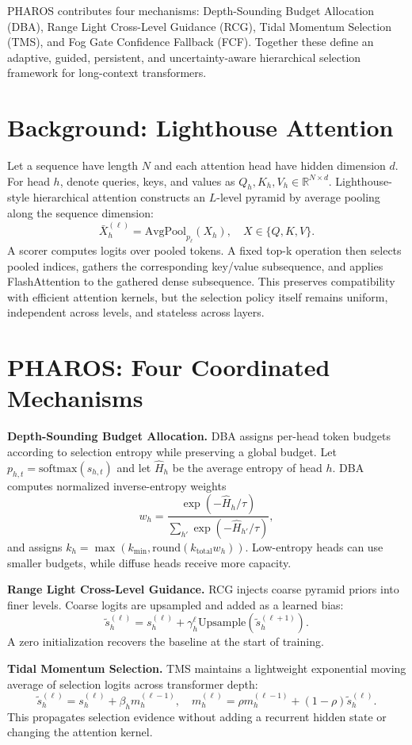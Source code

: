 \documentclass[letterpaper]{article}
\begin{document}
PHAROS contributes four mechanisms: Depth-Sounding Budget Allocation (DBA), Range Light Cross-Level Guidance (RCG), Tidal Momentum Selection (TMS), and Fog Gate Confidence Fallback (FCF). Together these define an adaptive, guided, persistent, and uncertainty-aware hierarchical selection framework for long-context transformers.

\section{Background: Lighthouse Attention}
Let a sequence have length $N$ and each attention head have hidden dimension $d$. For head $h$, denote queries, keys, and values as $Q_h,K_h,V_h \in \mathbb{R}^{N\times d}$. Lighthouse-style hierarchical attention constructs an $L$-level pyramid by average pooling along the sequence dimension:
\[
\bar{X}^{(\ell)}_h = \mathrm{AvgPool}_{p_\ell}(X_h), \quad X\in\{Q,K,V\}.
\]
A scorer computes logits over pooled tokens. A fixed top-k operation then selects pooled indices, gathers the corresponding key/value subsequence, and applies FlashAttention to the gathered dense subsequence. This preserves compatibility with efficient attention kernels, but the selection policy itself remains uniform, independent across levels, and stateless across layers.

\section{PHAROS: Four Coordinated Mechanisms}
\textbf{Depth-Sounding Budget Allocation.} DBA assigns per-head token budgets according to selection entropy while preserving a global budget. Let $p_{h,t}=\mathrm{softmax}(s_{h,t})$ and let $\hat H_h$ be the average entropy of head $h$. DBA computes normalized inverse-entropy weights
\[
w_h = \frac{\exp(-\hat H_h/\tau)}{\sum_{h'}\exp(-\hat H_{h'}/\tau)},
\]
and assigns $k_h = \max(k_{\min}, \mathrm{round}(k_{\mathrm{total}}w_h))$. Low-entropy heads can use smaller budgets, while diffuse heads receive more capacity.

\textbf{Range Light Cross-Level Guidance.} RCG injects coarse pyramid priors into finer levels. Coarse logits are upsampled and added as a learned bias:
\[
\tilde{s}^{(\ell)}_h=s^{(\ell)}_h+\gamma^\ell_h\mathrm{Upsample}(\tilde{s}^{(\ell+1)}_h).
\]
A zero initialization recovers the baseline at the start of training.

\textbf{Tidal Momentum Selection.} TMS maintains a lightweight exponential moving average of selection logits across transformer depth:
\[
\tilde{s}^{(\ell)}_h=s^{(\ell)}_h+\beta_h m^{(\ell-1)}_h, \quad m^{(\ell)}_h=\rho m^{(\ell-1)}_h+(1-\rho)\tilde{s}^{(\ell)}_h.
\]
This propagates selection evidence without adding a recurrent hidden state or changing the attention kernel.
\end{document}
